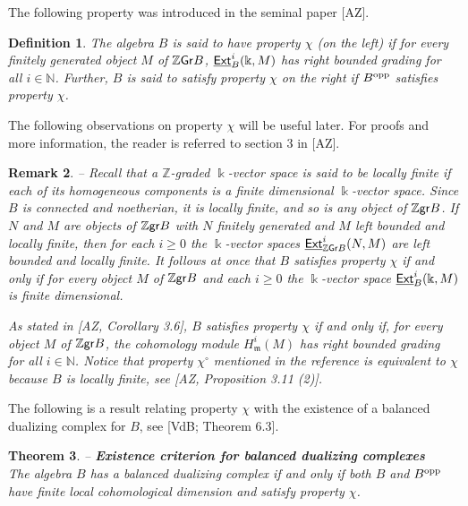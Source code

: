 \documentclass[twoside,11pt]{article}
\renewcommand{\k}{\Bbbk}
\newcommand{\N}{{\mathbb N}}
\newcommand{\Z}{{\mathbb Z}}
\newcommand{\m}{{\mathfrak m}}
\newcommand{\GrMod}{{\sf Gr}}
\newcommand{\grmod}{{\sf gr}}
\newcommand{\EXT}{\underline{\sf Ext}}
\newcommand{\opp}{{\rm opp}}
\newtheorem{subtheorem}{Theorem}[subsection]
\newtheorem{subdefinition}[subtheorem]{Definition}
\newtheorem{subremark}[subtheorem]{Remark}
\begin{document}
The following property was introduced in the seminal paper [AZ]. 
\begin{subdefinition} 
The algebra $B$ is said to have property $\chi$ (on the left) if for every finitely
generated object $M$ of $\Z\GrMod B $, $\EXT_B^i(\k,M)$ has right bounded grading for all
$i\in\N$. Further, $B$ is said to satisfy property $\chi$ on the right if $B^\opp$
satisfies property $\chi$.
\end{subdefinition}

The following observations on property $\chi$ will be useful later. 
For proofs and more information, the reader is referred to section 3 in [AZ].

\begin{subremark} -- \label{ki-et-dimension} \rm
Recall that a $\Z$-graded $\k$-vector space is said to be locally finite if each of its
homogeneous components is a finite dimensional $\k$-vector space. Since $B$ is connected
and noetherian, it is locally finite, and so is any object of $\Z\grmod B $. If $N$ and
$M$ are objects of $\Z\grmod B $ with $N$ finitely generated and $M$ left bounded and
locally finite, then for each $i \geq 0$ the $\k$-vector spaces $\EXT_{\Z\GrMod B }^i(N,M)$ are
left bounded and locally finite. It follows at once that $B$ satisfies property $\chi$ if
and only if for every object $M$ of $\Z\grmod B $ and each $i \geq 0$ the $\k$-vector space
$\EXT_B^i(\k,M)$ is finite dimensional.

As stated in [AZ, Corollary 3.6], $B$ satisfies property $\chi$ if and only if, for every
object $M$ of $\Z\grmod B $, the cohomology module $H_\m^i(M)$ has right bounded grading
for all $i\in\N$. Notice that property $\chi^\circ$ mentioned in the reference is
equivalent to $\chi$ because $B$ is locally finite, see [AZ, Proposition 3.11 (2)].
\end{subremark}

The following is a result relating property $\chi$ with the existence
of a balanced dualizing complex for $B$, see [VdB; Theorem 6.3].

\begin{subtheorem} -- {\bf Existence criterion for balanced dualizing complexes}
\label{critere-vdb}\\
The algebra $B$ has a balanced dualizing complex if and only if both $B$ and $B^\opp$ have
finite local cohomological dimension and satisfy property $\chi$.
\end{subtheorem}
\end{document}
